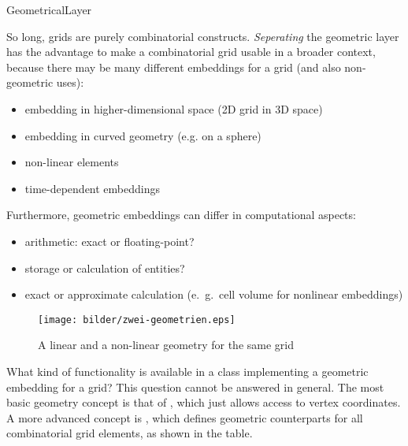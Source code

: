 
\begin{Label}{GeometricalLayer}
\end{Label}


So long, grids are purely combinatorial constructs. 
{\em Seperating\/} the geometric
layer has the advantage to make a combinatorial grid usable in a 
broader context, because there may be many different embeddings for
a grid (and also non-geometric uses):

\begin{itemize}
\item  embedding in higher-dimensional space (2D grid in 3D space)
\item embedding in curved geometry (e.g. on a sphere)
\item non-linear elements
\item time-dependent embeddings 
\end{itemize}

Furthermore, geometric embeddings can differ in computational aspects:
\begin{itemize}
\item arithmetic: exact or floating-point?
\item storage or calculation of entities?
\item exact or approximate calculation (e.\ g.\ cell volume
  for nonlinear embeddings)
\end{itemize}

   \begin{figure}[h]
     \begin{center}
       \T\texttt{[image: bilder/zwei-geometrien.eps]}
       \W{}
      \caption{A linear and a non-linear geometry for the same grid}
     \end{center}
   \end{figure}


What kind of functionality is available in a class implementing a 
geometric embedding for a grid?
This question cannot be answered in general.
The most basic geometry concept is that of ,
which just allows access to vertex coordinates.
A more advanced concept is 
,
which defines geometric counterparts for all combinatorial grid elements,
as shown in the table.

